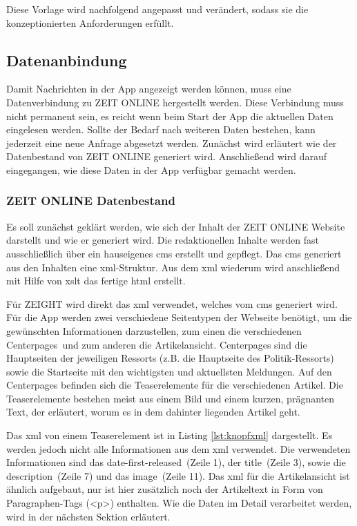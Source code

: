 \documentclass[12pt,a4paper,bibtotoc,abstracton]{scrartcl}
\begin{document}
Diese Vorlage wird nachfolgend angepasst und verändert, sodass sie die konzeptionierten Anforderungen erfüllt.

\subsection{Datenanbindung}
\label{subsec:datenanbindung}
Damit Nachrichten in der App angezeigt werden können, muss eine Datenverbindung zu ZEIT ONLINE hergestellt werden. Diese Verbindung muss nicht permanent sein, es reicht wenn beim Start der App die aktuellen Daten eingelesen werden. Sollte der Bedarf nach weiteren Daten bestehen, kann jederzeit eine neue Anfrage abgesetzt werden. Zunächst wird erläutert wie der Datenbestand von ZEIT ONLINE generiert wird. Anschließend wird darauf eingegangen, wie diese Daten in der App verfügbar gemacht werden.

\subsubsection{ZEIT ONLINE Datenbestand}
\label{subsubsec:zondatenbestand}
Es soll zunächst geklärt werden, wie sich der Inhalt der ZEIT ONLINE Website darstellt und wie er generiert wird. Die redaktionellen Inhalte werden fast ausschließlich über ein hauseigenes \ac{cms} erstellt und gepflegt. Das \ac{cms} generiert aus den Inhalten eine \ac{xml}-Struktur. Aus dem \ac{xml} wiederum wird anschließend mit Hilfe von \ac{xslt} das fertige \ac{html} erstellt.

Für ZEIGHT wird direkt das \ac{xml} verwendet, welches vom \ac{cms} generiert wird. Für die App werden zwei verschiedene Seitentypen der Webseite benötigt, um die gewünschten Informationen darzustellen, zum einen die verschiedenen \glqq Centerpages\grqq\ und zum anderen die Artikelansicht. Centerpages sind die Hauptseiten der jeweiligen Ressorts (z.B. die Hauptseite des Politik-Ressorts) sowie die Startseite mit den wichtigsten und aktuellsten Meldungen. Auf den Centerpages befinden sich die Teaserelemente für die verschiedenen Artikel. Die Teaserelemente bestehen meist aus einem Bild und einem kurzen, prägnanten Text, der erläutert, worum es in dem dahinter liegenden Artikel geht.\\

\begin{minipage}{\linewidth}

\end{minipage}

Das \ac{xml} von einem Teaserelement ist in Listing \ref{lst:knopfxml} dargestellt. Es werden jedoch nicht alle Informationen aus dem \ac{xml} verwendet. Die verwendeten Informationen sind das \glqq date-first-released\grqq\ (Zeile 1), der \glqq title\grqq\ (Zeile 3), sowie die \glqq description\grqq\ (Zeile 7) und das \glqq image\grqq\ (Zeile 11). Das \ac{xml} für die Artikelansicht ist ähnlich aufgebaut, nur ist hier zusätzlich noch der Artikeltext in Form von Paragraphen-Tags (<p>) enthalten. Wie die Daten im Detail verarbeitet werden, wird in der nächsten Sektion erläutert.
\end{document}
